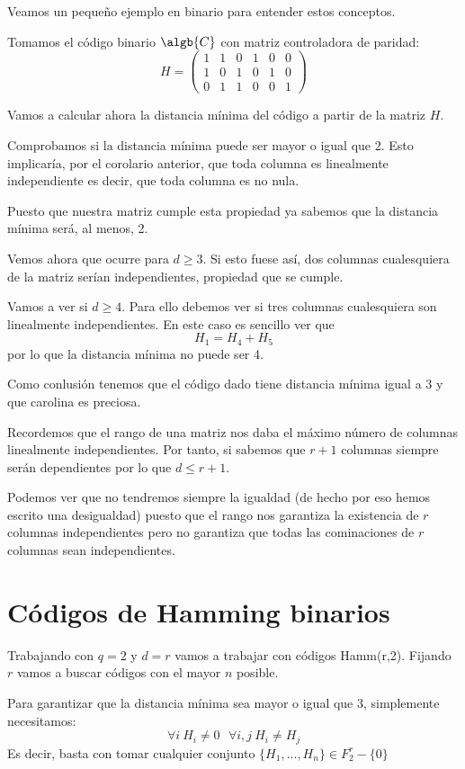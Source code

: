 Veamos un pequeño ejemplo en binario para entender estos conceptos.
\begin{example}
Tomamos el código binario $\algb{C}$ con matriz controladora de paridad:
\[H = \left(\begin{array}{cccccc}
1 & 1 & 0 & 1 & 0 & 0 \\
1 & 0 & 1 & 0 & 1 & 0\\
0 & 1 & 1 & 0 & 0 & 1
\end{array}\right) \]

Vamos a calcular ahora la distancia mínima del código a partir de la matriz $H$.

Comprobamos si la distancia mínima puede ser mayor o igual que 2. Esto implicaría, por el corolario anterior, que toda columna es linealmente independiente es decir, que toda columna es no nula.

Puesto que nuestra matriz cumple esta propiedad ya sabemos que la distancia mínima será, al menos, 2.

Vemos ahora que ocurre para $d\geq 3$. Si esto fuese así, dos columnas cualesquiera de la matriz serían independientes, propiedad que se cumple.

Vamos a ver si $d \geq 4$. Para ello debemos ver si tres columnas cualesquiera son linealmente independientes. En este caso es sencillo ver que
\[H_1=H_4+H_5\]
por lo que la distancia mínima no puede ser 4.

Como conlusión tenemos que el código dado tiene distancia mínima igual a 3 y que carolina es preciosa.
\end{example}

Recordemos que el rango de una matriz nos daba el máximo número de columnas linealmente independientes. Por tanto, si sabemos que $r+1$ columnas siempre serán dependientes por lo que $d\leq r+1$.

Podemos ver que no tendremos siempre la igualdad (de hecho por eso hemos escrito una desigualdad) puesto que el rango nos garantiza la existencia de $r$ columnas independientes pero no garantiza que todas las cominaciones de $r$ columnas sean independientes.

\section{Códigos de Hamming binarios}
Trabajando con $q=2$ y $d=r$ vamos a trabajar con códigos Hamm(r,2). Fijando $r$ vamos a buscar códigos con el mayor $n$ posible.

Para garantizar que la distancia mínima sea mayor o igual que 3, simplemente necesitamos:
\[\forall i \ H_i \neq 0 \ \ \ \forall i,j \ H_i \neq H_j\]
Es decir, basta con tomar cualquier conjunto $\{H_1,...,H_n\}\in F_2^r-\{0\}$

